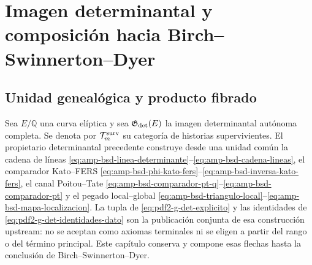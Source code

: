 \chapter{Imagen determinantal y composición hacia Birch--Swinnerton--Dyer}

\section{Unidad genealógica y producto fibrado}

Sea $E/\mathbb Q$ una curva elíptica y sea
$\mathfrak G_{\rm det}(E)$ la imagen determinantal autónoma completa. Se
denota por $\mathcal T_m^{\rm surv}$ su categoría de historias
supervivientes. El propietario determinantal precedente construye desde una
unidad común la cadena de líneas
\eqref{eq:amp-bsd-linea-determinante}--\eqref{eq:amp-bsd-cadena-lineas}, el
comparador Kato--FERS
\eqref{eq:amp-bsd-phi-kato-fers}--\eqref{eq:amp-bsd-inversa-kato-fers}, el
canal Poitou--Tate
\eqref{eq:amp-bsd-comparador-pt-q}--\eqref{eq:amp-bsd-comparador-pt} y el
pegado local--global
\eqref{eq:amp-bsd-triangulo-local}--\eqref{eq:amp-bsd-mapa-localizacion}.
La tupla de \eqref{eq:pdf2-g-det-explicito} y las identidades de
\eqref{eq:pdf2-g-det-identidades-dato} son la publicación conjunta de esa
construcción upstream: no se aceptan como axiomas terminales ni se eligen a
partir del rango o del término principal. Este capítulo conserva y compone
esas flechas hasta la conclusión de Birch--Swinnerton--Dyer.

